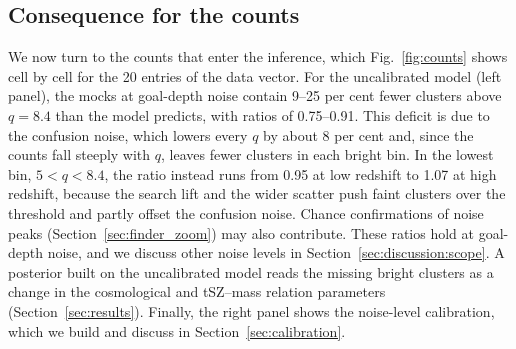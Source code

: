 \subsection{Consequence for the counts}\label{sec:finder_counts}

We now turn to the counts that enter the inference, which Fig.~\ref{fig:counts} shows cell by cell for the 20
entries of the data vector. For the uncalibrated model (left panel), the mocks at goal-depth noise contain
9--25 per cent fewer clusters above $q = 8.4$ than the model predicts, with ratios of 0.75--0.91. This deficit
is due to the confusion noise, which lowers every $q$ by about 8 per cent and, since the counts fall steeply
with $q$, leaves fewer clusters in each bright bin. In the lowest bin, $5 < q < 8.4$, the ratio instead runs
from 0.95 at low redshift to 1.07 at high redshift, because the search lift and the wider scatter push faint
clusters over the threshold and partly offset the confusion noise. Chance confirmations of noise peaks
(Section~\ref{sec:finder_zoom}) may also contribute. These ratios hold at
goal-depth noise, and we discuss other noise levels in Section~\ref{sec:discussion:scope}. A posterior built on
the uncalibrated model reads the missing bright clusters as a change in the cosmological and tSZ--mass
relation parameters (Section~\ref{sec:results}). Finally, the right panel shows the noise-level calibration, which we
build and discuss in Section~\ref{sec:calibration}.
